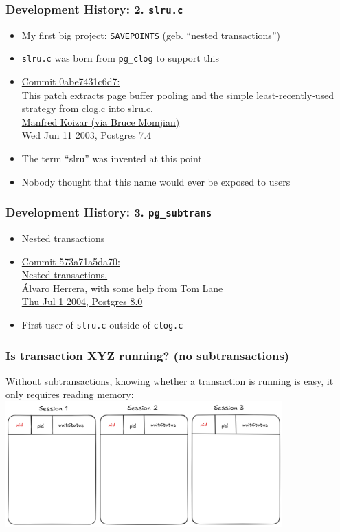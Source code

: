 \begin{frame}
  \frametitle{Development History: 2. \texttt{slru.c}}
  \begin{itemize}
    \item My first big project: \texttt{SAVEPOINTS} (geb. ``nested transactions'')
    \item \texttt{slru.c} was born from \texttt{pg\_clog} to support this
    \item {\linksize \href{https://git.postgresql.org/cgit/postgresql.git/commit/?id=0abe7431c6d7a022e7f24a4f145c702900f56174}
      {Commit 0abe7431c6d7: \faExternalLink \\
      This patch extracts page buffer pooling and the simple least-recently-used strategy from clog.c into slru.c. \\
      Manfred Koizar (via Bruce Momjian) \\
      Wed Jun 11 2003, Postgres 7.4}}
    \item The term ``slru'' was invented at this point
    \item Nobody thought that this name would ever be exposed to users
\end{itemize}
\end{frame}

\begin{frame}
  \frametitle{Development History: 3. \texttt{pg\_subtrans}}
  \begin{itemize}
    \item Nested transactions
    \item {\linksize \href{https://git.postgresql.org/cgit/postgresql.git/commit/?id=573a71a5da70d6e2503c8f53e3b4f26b3b6d738d}
      {Commit 573a71a5da70: \faExternalLink \\
      Nested transactions. \\
      Álvaro Herrera, with some help from Tom Lane \\
      Thu Jul 1 2004, Postgres 8.0}}
    \item First user of \texttt{slru.c} outside of \texttt{clog.c}
  \end{itemize}
\end{frame}

\begin{frame}
  \frametitle{Is transaction XYZ running? (no subtransactions)}
  Without subtransactions, knowing whether a transaction is running
  is easy, it only requires reading memory:
  \includegraphics[width=0.8\textwidth]{pgproc-no-subxids.png}
\end{frame}

